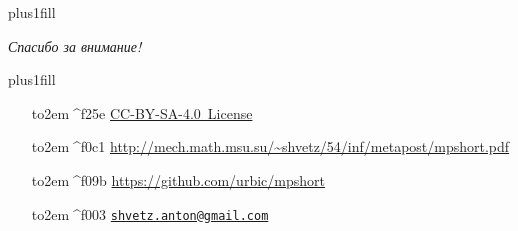 \begin{frame}

\vskip0pt plus1fill

\begin{center}
\Huge\itshape
Спасибо за внимание!
\end{center}

\vskip0pt plus1fill

\begin{itemize}
\footnotesize
\item[\hbox to2em{\hfil{\fontspec{FontAwesome}^^^^f25e}\hfil}]
\href{https://creativecommons.org/licenses/by-sa/4.0/deed.ru}
{{CC-BY-SA-4.0 License}}
\item[\hbox to2em{\hfil{\fontspec{FontAwesome}^^^^f0c1}\hfil}]
\url{http://mech.math.msu.su/~shvetz/54/inf/metapost/mpshort.pdf}
\item[\hbox to2em{\hfil{\fontspec{FontAwesome}^^^^f09b}\hfil}]
\url{https://github.com/urbic/mpshort}
\item[\hbox to2em{\hfil{\fontspec{FontAwesome}^^^^f003}\hfil}]
\href{mailto:shvetz.anton@gmail.com?subject=mpshort}{\nolinkurl{shvetz.anton@gmail.com}}
\end{itemize}
\end{frame}
